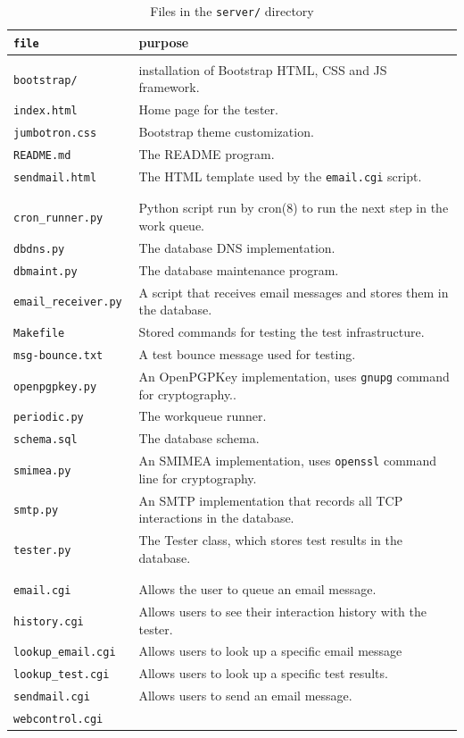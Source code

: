 \documentclass[preprint,3p]{elsarticle}
\begin{document}
\begin{table}
\begin{tabularx}{\textwidth}{>{\tt}lX}
\textrm{file} & purpose\\
\hline
\multicolumn{2}{l}{\textbf{HTML files:}}\\
bootstrap/         & installation of Bootstrap HTML, CSS and JS framework.\\
index.html         & Home page for the tester.\\
jumbotron.css      & Bootstrap theme customization.\\
README.md          & The README program.\\
sendmail.html      & The HTML template used by the \texttt{email.cgi} script.\\
\\
\multicolumn{2}{l}{\textbf{Python Modules and Scripts:}}\\
cron\_runner.py    & Python script run by cron(8) to run the next step in the work queue.  \\
dbdns.py           & The database DNS implementation.\\
dbmaint.py         & The database maintenance program.\\
email\_receiver.py & A script that receives email messages and stores them in the database.\\
Makefile           & Stored commands for testing the test infrastructure.\\
msg-bounce.txt     & A test bounce message used for testing.\\
openpgpkey.py      & An OpenPGPKey implementation, uses \texttt{gnupg} command for cryptography..\\
periodic.py        & The workqueue runner.\\
schema.sql         & The database schema.\\
smimea.py          & An SMIMEA implementation, uses \texttt{openssl} command line for cryptography.\\ 
smtp.py            & An SMTP implementation that records all TCP interactions in the database.\\
tester.py          & The Tester class, which stores test results in the database.\\
\\
\multicolumn{2}{l}{\textbf{CGI Scripts:}}\\
email.cgi         & Allows the user to queue an email message.\\
history.cgi       & Allows users to see their interaction history with the tester.\\
lookup\_email.cgi & Allows users to look up a specific email message\\
lookup\_test.cgi  & Allows users to look up a specific test results.\\
sendmail.cgi      & Allows users to send an email message. \\
webcontrol.cgi    & \\
\end{tabularx}
\caption{Files in the \texttt{server/} directory}\label{tlsa}
\end{table}
\end{document}
